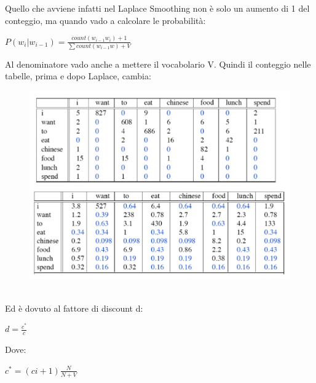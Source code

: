 Quello che avviene infatti nel Laplace Smoothing non è solo un aumento di 1 del conteggio, ma quando vado a calcolare le probabilità:
\begin{center}
    \begin{math}
        P(w_i | w_{i-1}) = \frac{count(w_{i-1}w_i) + 1}{\sum count(w_{i-1}w) + V}
    \end{math}
\end{center}
Al denominatore vado anche a mettere il vocabolario V. Quindi il conteggio nelle tabelle, prima e dopo Laplace, cambia: 
\\
\begin{figure}[th]
    \centering
    \includegraphics[scale=0.45]{Text Analysis/img/compare.png}
\end{figure}
\\
Ed è dovuto al fattore di discount d:
\begin{center}
    \begin{math}
        d = \frac{c^*}{c} 
    \end{math}
\end{center}
Dove:
\begin{center}
    \begin{math}
        c^* = (ci+1)\frac{N}{N+V} 
    \end{math}
\end{center}

\newpage

